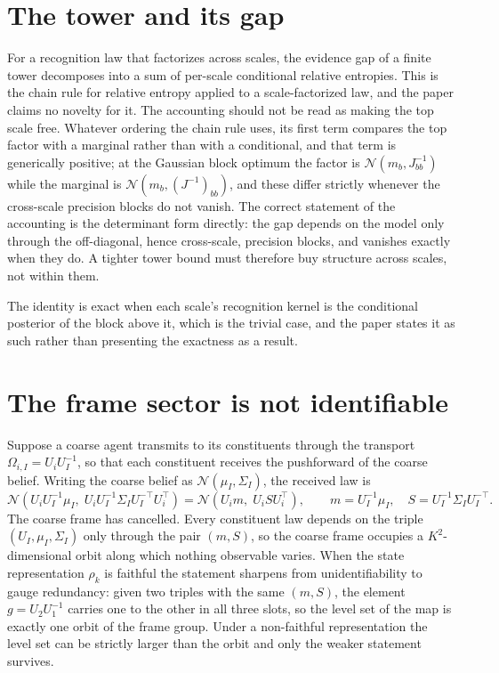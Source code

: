 \section{The tower and its gap}

For a recognition law that factorizes across scales, the evidence gap of a finite tower decomposes into a sum of per-scale conditional relative entropies. This is the chain rule for relative entropy applied to a scale-factorized law, and the paper claims no novelty for it. The accounting should not be read as making the top scale free. Whatever ordering the chain rule uses, its first term compares the top factor with a marginal rather than with a conditional, and that term is generically positive; at the Gaussian block optimum the factor is \(\mathcal N(m_b,J_{bb}^{-1})\) while the marginal is \(\mathcal N(m_b,(J^{-1})_{bb})\), and these differ strictly whenever the cross-scale precision blocks do not vanish. The correct statement of the accounting is the determinant form directly: the gap depends on the model only through the off-diagonal, hence cross-scale, precision blocks, and vanishes exactly when they do. A tighter tower bound must therefore buy structure across scales, not within them.

The identity is exact when each scale's recognition kernel is the conditional posterior of the block above it, which is the trivial case, and the paper states it as such rather than presenting the exactness as a result.

\section{The frame sector is not identifiable}

Suppose a coarse agent transmits to its constituents through the transport \(\Omega_{i,I}=U_iU_I^{-1}\), so that each constituent receives the pushforward of the coarse belief. Writing the coarse belief as \(\mathcal N(\mu_I,\Sigma_I)\), the received law is
\begin{equation}
\mathcal N\!\left(U_iU_I^{-1}\mu_I,\;U_iU_I^{-1}\Sigma_I U_I^{-\top}U_i^{\top}\right)
=\mathcal N\!\left(U_i m,\;U_i S U_i^{\top}\right),
\qquad
m=U_I^{-1}\mu_I,
\quad
S=U_I^{-1}\Sigma_I U_I^{-\top}.
\label{eq:coarse-frame-unidentifiable}
\end{equation}
The coarse frame has cancelled. Every constituent law depends on the triple \((U_I,\mu_I,\Sigma_I)\) only through the pair \((m,S)\), so the coarse frame occupies a \(K^2\)-dimensional orbit along which nothing observable varies. When the state representation \(\rho_k\) is faithful the statement sharpens from unidentifiability to gauge redundancy: given two triples with the same \((m,S)\), the element \(g=U_2U_1^{-1}\) carries one to the other in all three slots, so the level set of the map is exactly one orbit of the frame group. Under a non-faithful representation the level set can be strictly larger than the orbit and only the weaker statement survives.


